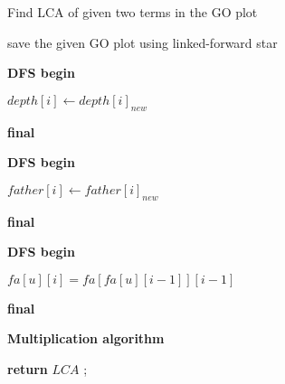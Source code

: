 \documentclass[8pt,twocolumn]{ctexart}
\begin{document}
 
    \begin{algorithm}
        
        \caption{Find LCA of given two terms in the GO plot}
        
        \LinesNumbered
        
        
        
        save the given GO plot using linked-forward star \;
        
        \textbf{DFS begin}{
        
        {
             $depth[i] \gets depth[i]_{new}$\;
        }
        }
        
        \textbf{final} \;
        
        \textbf{DFS begin}{
        
        {
             $father[i] \gets father[i]_{new}$\;
        }
        }
        
        \textbf{final} \;
        
        \textbf{DFS begin}
        
            $fa[u][i]=fa[fa[u][i-1]][i-1]$ \;
        
        \textbf{final} \;
        
        \textbf{Multiplication algorithm} \;
        
        \textbf{return} $LCA$ ;
        
    \end{algorithm}
 
\end{document}
